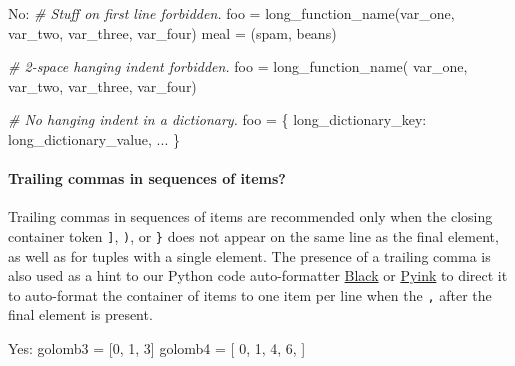 \documentclass[
]{article}
\newenvironment{Shaded}{}{}
\newcommand{\CommentTok}[1]{\textcolor[rgb]{0.38,0.63,0.69}{\textit{#1}}}
\newcommand{\DecValTok}[1]{\textcolor[rgb]{0.25,0.63,0.44}{#1}}
\newcommand{\NormalTok}[1]{#1}
\newcommand{\OperatorTok}[1]{\textcolor[rgb]{0.40,0.40,0.40}{#1}}
\newcommand{\StringTok}[1]{\textcolor[rgb]{0.25,0.44,0.63}{#1}}
\begin{document}
\begin{samepage}
\begin{Shaded}
\begin{Highlighting}[]
\NormalTok{No:    }\CommentTok{\# Stuff on first line forbidden.}
\NormalTok{       foo }\OperatorTok{=}\NormalTok{ long\_function\_name(var\_one, var\_two,}
\NormalTok{           var\_three, var\_four)}
\NormalTok{       meal }\OperatorTok{=}\NormalTok{ (spam,}
\NormalTok{           beans)}

       \CommentTok{\# 2{-}space hanging indent forbidden.}
\NormalTok{       foo }\OperatorTok{=}\NormalTok{ long\_function\_name(}
\NormalTok{         var\_one, var\_two, var\_three,}
\NormalTok{         var\_four)}

       \CommentTok{\# No hanging indent in a dictionary.}
\NormalTok{       foo }\OperatorTok{=}\NormalTok{ \{}
           \StringTok{\textquotesingle{}long\_dictionary\_key\textquotesingle{}}\NormalTok{:}
\NormalTok{           long\_dictionary\_value,}
\NormalTok{           ...}
\NormalTok{       \}}
\end{Highlighting}
\end{Shaded}
\end{samepage}

\paragraph{Trailing commas in sequences of items?}

Trailing commas in sequences of items are recommended only when the
closing container token \texttt{{]}}, \texttt{)}, or \texttt{\}} does
not appear on the same line as the final element, as well as for tuples
with a single element. The presence of a trailing comma is also used as
a hint to our Python code auto-formatter
\href{https://github.com/psf/black}{Black} or
\href{https://github.com/google/pyink}{Pyink} to direct it to
auto-format the container of items to one item per line when the
\texttt{,} after the final element is present.

\begin{samepage}
\begin{Shaded}
\begin{Highlighting}[]
\NormalTok{Yes:   golomb3 }\OperatorTok{=}\NormalTok{ [}\DecValTok{0}\NormalTok{, }\DecValTok{1}\NormalTok{, }\DecValTok{3}\NormalTok{]}
\NormalTok{       golomb4 }\OperatorTok{=}\NormalTok{ [}
           \DecValTok{0}\NormalTok{,}
           \DecValTok{1}\NormalTok{,}
           \DecValTok{4}\NormalTok{,}
           \DecValTok{6}\NormalTok{,}
\NormalTok{       ]}
\end{Highlighting}
\end{Shaded}
\end{samepage}
\end{document}

